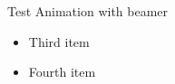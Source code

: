 \documentclass{beamer}
\begin{document}
    \begin{frame}{Test}
    Animation with beamer 
        \begin{itemize}[<+(1)- | alert@+>]
            \item<4-5> Third item
            \item<5> Fourth item
        \end{itemize}
    \end{frame}
\end{document}
